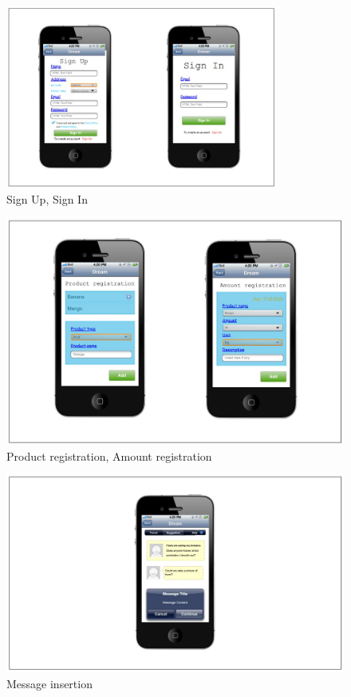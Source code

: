 \begin{figure}[H]
	\centering
    \includegraphics[page=1, width=0.8\textwidth]{Images/sign_up_in.JPG}

	\caption{\label{fig:FE_image1}Sign Up, Sign In}

\end{figure}

\begin{figure}[H]
	\centering
    \includegraphics[page=1, width=\textwidth]{Images/product_amount_registration.JPG}
	\caption{\label{fig:FE_image2}Product registration, Amount registration}

\end{figure}



\begin{figure}[H]
	\centering
    \includegraphics[page=1, width=\textwidth]{Images/message_insertion.JPG}
	\caption{\label{fig:FE_image3}Message insertion}

\end{figure}

